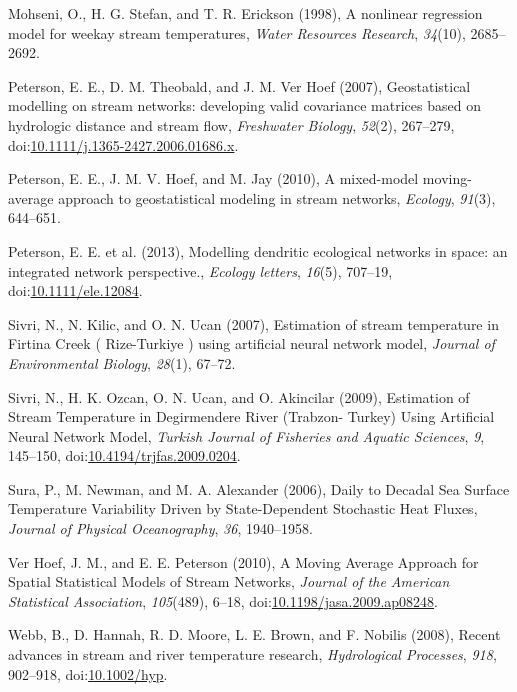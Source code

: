 \hypertarget{ref-Mohseni1998}{}
Mohseni, O., H. G. Stefan, and T. R. Erickson (1998), A nonlinear
regression model for weekay stream temperatures, \emph{Water Resources
Research}, \emph{34}(10), 2685--2692.

\hypertarget{ref-Peterson2007}{}
Peterson, E. E., D. M. Theobald, and J. M. Ver Hoef (2007),
Geostatistical modelling on stream networks: developing valid covariance
matrices based on hydrologic distance and stream flow, \emph{Freshwater
Biology}, \emph{52}(2), 267--279,
doi:\href{https://doi.org/10.1111/j.1365-2427.2006.01686.x}{10.1111/j.1365-2427.2006.01686.x}.

\hypertarget{ref-Peterson2010}{}
Peterson, E. E., J. M. V. Hoef, and M. Jay (2010), A mixed-model
moving-average approach to geostatistical modeling in stream networks,
\emph{Ecology}, \emph{91}(3), 644--651.

\hypertarget{ref-Peterson2013}{}
Peterson, E. E. et al. (2013), Modelling dendritic ecological networks
in space: an integrated network perspective., \emph{Ecology letters},
\emph{16}(5), 707--19,
doi:\href{https://doi.org/10.1111/ele.12084}{10.1111/ele.12084}.

\hypertarget{ref-Sivri2007}{}
Sivri, N., N. Kilic, and O. N. Ucan (2007), Estimation of stream
temperature in Firtina Creek ( Rize-Turkiye ) using artificial neural
network model, \emph{Journal of Environmental Biology}, \emph{28}(1),
67--72.

\hypertarget{ref-Sivri2009}{}
Sivri, N., H. K. Ozcan, O. N. Ucan, and O. Akincilar (2009), Estimation
of Stream Temperature in Degirmendere River (Trabzon- Turkey) Using
Artificial Neural Network Model, \emph{Turkish Journal of Fisheries and
Aquatic Sciences}, \emph{9}, 145--150,
doi:\href{https://doi.org/10.4194/trjfas.2009.0204}{10.4194/trjfas.2009.0204}.

\hypertarget{ref-Sura2006}{}
Sura, P., M. Newman, and M. A. Alexander (2006), Daily to Decadal Sea
Surface Temperature Variability Driven by State-Dependent Stochastic
Heat Fluxes, \emph{Journal of Physical Oceanography}, \emph{36},
1940--1958.

\hypertarget{ref-VerHoef2010}{}
Ver Hoef, J. M., and E. E. Peterson (2010), A Moving Average Approach
for Spatial Statistical Models of Stream Networks, \emph{Journal of the
American Statistical Association}, \emph{105}(489), 6--18,
doi:\href{https://doi.org/10.1198/jasa.2009.ap08248}{10.1198/jasa.2009.ap08248}.

\hypertarget{ref-Webb2008}{}
Webb, B., D. Hannah, R. D. Moore, L. E. Brown, and F. Nobilis (2008),
Recent advances in stream and river temperature research,
\emph{Hydrological Processes}, \emph{918}, 902--918,
doi:\href{https://doi.org/10.1002/hyp}{10.1002/hyp}.

